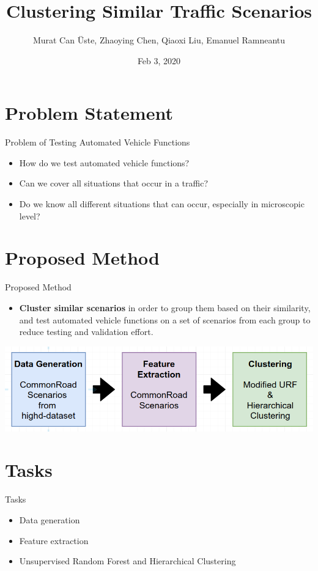 \documentclass[shortpres]{beamer}
\title[Motion Planning for Autonomous Vehicles]{Clustering Similar Traffic Scenarios}
\author[\"Uste, Chen, Liu, Ramneantu]{Murat Can \"Uste, Zhaoying Chen, Qiaoxi Liu, Emanuel Ramneantu}
\institute[TU M\"unchen]{Technische Universit\"at M\"unchen}
\date{Feb 3, 2020}
\begin{document}
\begin{frame}
    \titlepage
\end{frame}

\section{Problem Statement}	

\begin{frame}{Problem of Testing Automated Vehicle Functions}	

\begin{itemize} 
\item How do we test automated vehicle functions?
\vfill \item  Can we cover all situations that occur in a traffic?
\vfill \item  Do we know all different situations that can occur, especially in microscopic level?
\end{itemize}
\end{frame}

\section{Proposed Method}	

\begin{frame}{Proposed Method}	

\begin{itemize} 
\item \textbf{Cluster similar scenarios} in order to group them based on their similarity, and test automated vehicle functions on a set of scenarios from each group to reduce testing and validation effort.
\end{itemize}

\includegraphics[width=\textwidth]{proposed_01}
\end{frame}

\section{Tasks}	

\begin{frame}{Tasks}	

\begin{itemize} 
\item Data generation
\vfill \item Feature extraction
\vfill \item Unsupervised Random Forest and Hierarchical Clustering
\end{itemize}
\end{frame}
\end{document}
